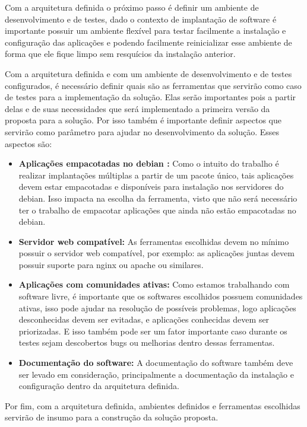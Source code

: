Com a arquitetura definida o próximo passo é definir um ambiente de desenvolvimento e de
testes, dado o contexto de implantação de software é importante possuir um ambiente flexível para
testar facilmente a instalação e configuração das aplicações e podendo facilmente
reinicializar esse ambiente de forma que ele fique limpo sem resquícios da instalação
anterior.

Com a arquitetura definida e com um ambiente de desenvolvimento e de testes configurados, é
necessário definir quais são as ferramentas que servirão como caso de testes
para a implementação da solução. Elas serão importantes pois a partir delas
e de suas necessidades que será implementado a primeira versão da proposta para
a solução. Por isso também é importante definir aspectos que servirão como parâmetro
para ajudar no desenvolvimento da solução. Esses aspectos são:

\begin{itemize}
  \item  \textbf{Aplicações empacotadas no debian :}  Como o intuito do trabalho
  é realizar implantações múltiplas a partir de um pacote único, tais aplicações
  devem estar empacotadas e disponíveis para instalação nos servidores do debian.
  Isso impacta na escolha da ferramenta, visto que não será necessário ter o trabalho
  de empacotar aplicações que ainda não estão empacotadas no debian.
  \item  \textbf{Servidor web compatível:} As ferramentas escolhidas devem no
  mínimo possuir o servidor web compatível, por exemplo: as aplicações juntas
  devem possuir suporte para nginx ou apache ou similares.
  \item  \textbf{Aplicações com comunidades ativas:} Como estamos trabalhando
  com software livre, é importante que os softwares escolhidos possuem comunidades
  ativas, isso pode ajudar na resolução de  possíveis problemas, logo aplicações
  desconhecidas devem ser evitadas, e aplicações conhecidas devem ser priorizadas.
  E isso também pode ser um fator importante caso durante os testes sejam descobertos
  bugs ou melhorias dentro dessas ferramentas.
  \item  \textbf{Documentação do software:} A documentação do software também deve
  ser levado em consideração, principalmente a documentação da instalação e configuração
  dentro da arquitetura definida.
\end{itemize}

Por fim, com a arquitetura definida, ambientes definidos e ferramentas escolhidas
servirão de insumo para a construção da solução proposta.
